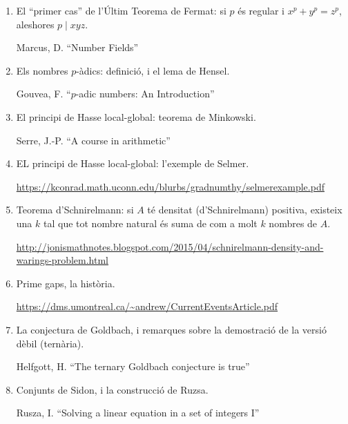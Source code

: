\begin{enumerate}
\item El ``primer cas'' de l'Últim Teorema de Fermat: si $p$ és regular i $x^p+y^p=z^p$, aleshores $p\mid xyz$.

  {\tiny Marcus, D. ``Number Fields''}

\item Els nombres $p$-àdics: definició, i el lema de Hensel.

  {\tiny Gouvea, F. ``$p$-adic numbers: An Introduction''}

\item El principi de Hasse local-global: teorema de Minkowski.

  {\tiny Serre, J.-P. ``A course in arithmetic''}

  \item EL principi de Hasse local-global: l'exemple de Selmer.

    {\tiny \url{https://kconrad.math.uconn.edu/blurbs/gradnumthy/selmerexample.pdf}}

  \item Teorema d'Schnirelmann: si $A$ té densitat (d'Schnirelmann) positiva, existeix una $k$ tal que tot nombre natural és suma de com a molt $k$ nombres de $A$.

    {\tiny \url{http://jonismathnotes.blogspot.com/2015/04/schnirelmann-density-and-warings-problem.html}}
  \item Prime gaps, la història.

    {\tiny \url{https://dms.umontreal.ca/~andrew/CurrentEventsArticle.pdf}}
  \item La conjectura de Goldbach, i remarques sobre la demostració de la versió dèbil (ternària).

    {\tiny Helfgott, H. ``The ternary Goldbach conjecture is true''}
  \item Conjunts de Sidon, i la construcció de Ruzsa.

    {\tiny Rusza, I. ``Solving a linear equation in a set of integers I''}
\end{enumerate}